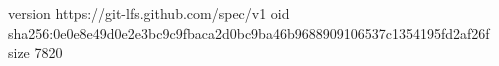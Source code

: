 version https://git-lfs.github.com/spec/v1
oid sha256:0e0e8e49d0e2e3bc9c9fbaca2d0bc9ba46b9688909106537c1354195fd2af26f
size 7820
